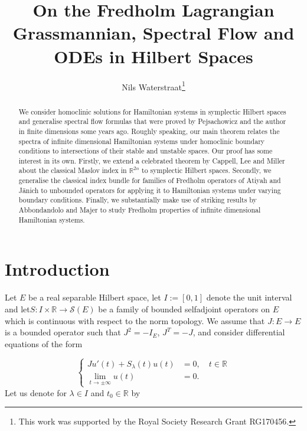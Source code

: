 \documentclass[a4paper,10pt]{article}
\title{On the Fredholm Lagrangian Grassmannian, Spectral Flow and ODEs in Hilbert Spaces}
\author{Nils Waterstraat\thanks{This work was supported by the Royal Society Research Grant RG170456.}}
\begin{document}
\date{}
\maketitle


\begin{abstract}
\noindent
We consider homoclinic solutions for Hamiltonian systems in symplectic Hilbert spaces and generalise spectral flow formulas that were proved by Pejsachowicz and the author in finite dimensions some years ago. Roughly speaking, our main theorem relates the spectra of infinite dimensional Hamiltonian systems under homoclinic boundary conditions to intersections of their stable and unstable spaces. Our proof has some interest in its own. Firstly, we extend a celebrated theorem by Cappell, Lee and Miller about the classical Maslov index in $\mathbb{R}^{2n}$ to symplectic Hilbert spaces. Secondly, we generalise the classical index bundle for families of Fredholm operators of Atiyah and J\"anich to unbounded operators for applying it to Hamiltonian systems under varying boundary conditions. Finally, we substantially make use of striking results by Abbondandolo and Majer to study Fredholm properties of infinite dimensional Hamiltonian systems.  
\end{abstract}




\section{Introduction}
Let $E$ be a real separable Hilbert space, let $I:=[0,1]$ denote the unit interval and let\linebreak $S:I\times\mathbb{R}\rightarrow\mathcal{S}(E)$ be a family of bounded selfadjoint operators on $E$ which is continuous with respect to the norm topology. We assume that $J:E\rightarrow E$ is a bounded operator such that $J^2=-I_E$, $J^T=-J$, and consider differential equations of the form

\begin{equation}\label{Hamiltonian}
\left\{
\begin{aligned}
Ju'(t)+S_\lambda(t)u(t)&=0,\quad t\in\mathbb{R}\\
\lim_{t\rightarrow\pm\infty}u(t)&=0.
\end{aligned}
\right.
\end{equation}
Let us denote for $\lambda\in I$ and $t_0\in\mathbb{R}$ by 
\end{document}
